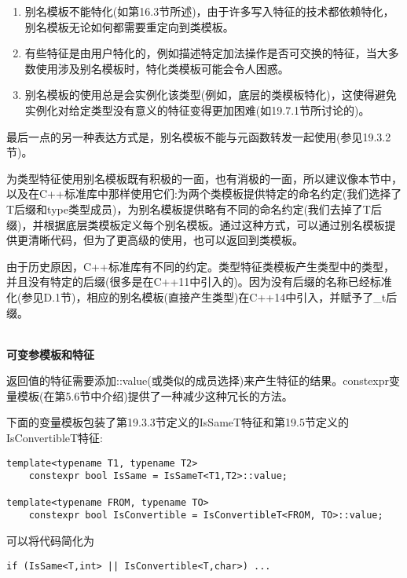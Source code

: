 \begin{enumerate}
\item
别名模板不能特化(如第16.3节所述)，由于许多写入特征的技术都依赖特化，别名模板无论如何都需要重定向到类模板。

\item 
有些特征是由用户特化的，例如描述特定加法操作是否可交换的特征，当大多数使用涉及别名模板时，特化类模板可能会令人困惑。

\item
别名模板的使用总是会实例化该类型(例如，底层的类模板特化)，这使得避免实例化对给定类型没有意义的特征变得更加困难(如19.7.1节所讨论的)。
\end{enumerate}

最后一点的另一种表达方式是，别名模板不能与元函数转发一起使用(参见19.3.2节)。

为类型特征使用别名模板既有积极的一面，也有消极的一面，所以建议像本节中，以及在C++标准库中那样使用它们:为两个类模板提供特定的命名约定(我们选择了T后缀和type类型成员)，为别名模板提供略有不同的命名约定(我们去掉了T后缀)，并根据底层类模板定义每个别名模板。通过这种方式，可以通过别名模板提供更清晰代码，但为了更高级的使用，也可以返回到类模板。

由于历史原因，C++标准库有不同的约定。类型特征类模板产生类型中的类型，并且没有特定的后缀(很多是在C++11中引入的)。因为没有后缀的名称已经标准化(参见D.1节)，相应的别名模板(直接产生类型)在C++14中引入，并赋予了\_t后缀。

\hspace*{\fill} \\ %
\noindent
\textbf{可变参模板和特征}

返回值的特征需要添加::value(或类似的成员选择)来产生特征的结果。constexpr变量模板(在第5.6节中介绍)提供了一种减少这种冗长的方法。

下面的变量模板包装了第19.3.3节定义的IsSameT特征和第19.5节定义的IsConvertibleT特征:

\begin{lstlisting}[style=styleCXX]
template<typename T1, typename T2>
	constexpr bool IsSame = IsSameT<T1,T2>::value;
	
template<typename FROM, typename TO>
	constexpr bool IsConvertible = IsConvertibleT<FROM, TO>::value;
\end{lstlisting}

可以将代码简化为

\begin{lstlisting}[style=styleCXX]
if (IsSame<T,int> || IsConvertible<T,char>) ...
\end{lstlisting}

